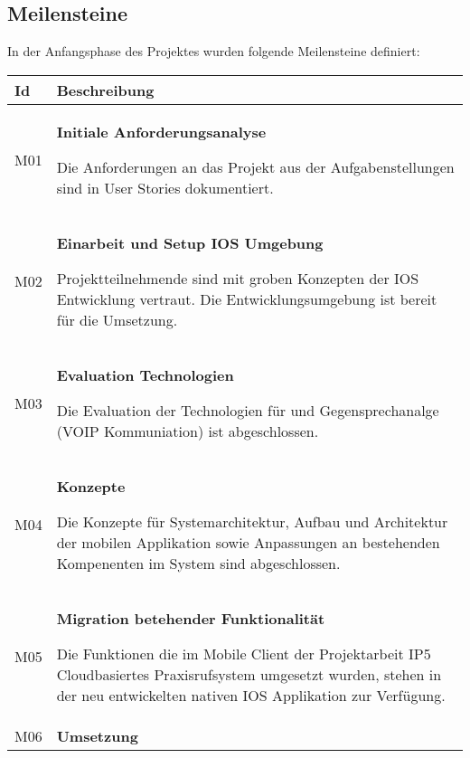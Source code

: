 \subsection{Meilensteine}

In der Anfangsphase des Projektes wurden folgende Meilensteine definiert:

\begin{table}[h]
    \centering
    \begin{tabular}{|l|p{15cm}|}
        \hline
        \textbf{Id} & \textbf{Beschreibung}                                                                                                                                                                                         \\
        \hline

        M01         & \textbf{Initiale Anforderungsanalyse}

        Die Anforderungen an das Projekt aus der Aufgabenstellungen sind in User Stories dokumentiert.\\
        \hline

        M02         & \textbf{Einarbeit und Setup IOS Umgebung}

        Projektteilnehmende sind mit groben Konzepten der IOS Entwicklung vertraut.
        Die Entwicklungsumgebung ist bereit für die Umsetzung. \\
        \hline

        M03         & \textbf{Evaluation Technologien}

        Die Evaluation der Technologien für  und Gegensprechanalge (VOIP Kommuniation) ist abgeschlossen. \\
        \hline

        M04         & \textbf{Konzepte}

        Die Konzepte für Systemarchitektur, Aufbau und Architektur der mobilen Applikation sowie Anpassungen
        an bestehenden Kompenenten im System sind abgeschlossen. \\
        \hline

        M05         & \textbf{Migration betehender Funktionalität}

        Die Funktionen die im Mobile Client der Projektarbeit IP5 Cloudbasiertes Praxisrufsystem umgesetzt wurden,
        stehen in der neu entwickelten nativen IOS Applikation zur Verfügung. \\
        \hline

        M06         & \textbf{Umsetzung }


\end{tabular}
\end{table}
